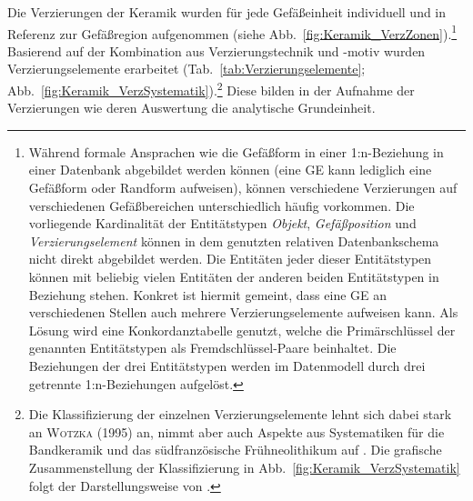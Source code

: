 \begin{multicols}{2}
Die Verzierungen der Keramik wurden für jede Gefäßeinheit individuell und in Referenz zur Gefäßregion aufgenommen (siehe Abb.~\ref{fig:Keramik_VerzZonen}).\footnote{Während formale Ansprachen wie die Gefäßform in einer 1:n-Beziehung in einer Datenbank abgebildet werden können (eine GE kann lediglich eine Gefäßform oder Randform aufweisen), können verschiedene Verzierungen auf verschiedenen Gefäßbereichen unterschiedlich häufig vorkommen. Die vorliegende Kardinalität der Entitätstypen \textit{Objekt}, \textit{Gefäßposition} und \textit{Verzierungselement} können in dem genutzten relativen Datenbankschema nicht direkt abgebildet werden. Die Entitäten jeder dieser Entitätstypen können mit beliebig vielen Entitäten der anderen beiden Entitätstypen in Beziehung stehen. Konkret ist hiermit gemeint, dass eine GE an verschiedenen Stellen auch mehrere Verzierungselemente aufweisen kann. Als Lösung wird eine Konkordanztabelle genutzt, welche die Primärschlüssel der genannten Entitätstypen als Fremdschlüssel-Paare beinhaltet. Die Beziehungen der drei Entitätstypen werden im Datenmodell durch drei getrennte 1:n-Beziehungen aufgelöst.} Basierend auf der Kombination aus Verzierungstechnik und -motiv wurden Verzierungselemente erarbeitet (Tab.~\ref{tab:Verzierungselemente}; Abb.~\ref{fig:Keramik_VerzSystematik}).\footnote{Die Klassifizierung der einzelnen Verzierungselemente lehnt sich dabei stark an \textsc{Wotzka} (1995) an, nimmt aber auch Aspekte aus Systematiken für die Bandkeramik \parencites{Stehli.1973}{Stehli.1977}{Kneipp.1998} und das südfranzösische Frühneolithikum auf \parencites[126\,f. Abb.~3]{Manen.2002}[auch bei][]{Linstadter.2013}. Die grafische Zusammenstellung der Klassifizierung in Abb.~\ref{fig:Keramik_VerzSystematik} folgt der Darstellungsweise von \textcite[80\,f. Abb.~39]{Keding.1997}.} Diese bilden in der Aufnahme der Verzierungen wie deren Auswertung die analytische Grundeinheit.


\end{multicols}
